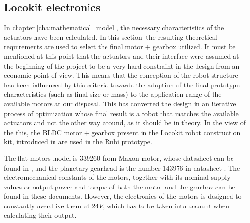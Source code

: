 
\subsection{Locokit electronics} %
\label{sub:locokit_electronics}
In chapter \ref{cha:mathematical_model}, the necessary characteristics of the actuators have been calculated.
In this section, the resulting theoretical requirements are used to select the final motor $+$ gearbox utilized.
It must be mentioned at this point that the actuators and their interface were assumed at the beginning of the project to be a very hard constraint in the design from an economic point of view. 
This means that the conception of the robot structure has been influenced by this criteria towards the adaption of the final prototype characteristics (such as final size or mass) to the application range of the available motors at our disposal.
This has converted the design in an iterative process of optimization whose final result is a robot that matches the available actuators and not the other way around, as it should be in theory.
In the view of the this, the BLDC motor $+$ gearbox present in the Locokit robot construction kit, introduced in \cite{locokit} are used in the Rubi prototype.

The flat motors model is 339260 from Maxon motor, whose datasheet can be found in \cite{maxon_motor}, and the planetary gearhead is the number 143976 in datasheet \cite{maxon_gear}.
The electromechanical constants of the motors, together with its nominal supply values or output power and torque of both the motor and the gearbox can be found in these documents. 
However, the electronics of the motors is designed to constantly overdrive them at $24V$, which has to be taken into account when calculating their output.

